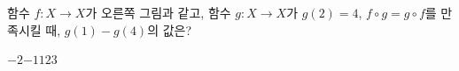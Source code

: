 \noindent\begin{minipage}[t]{0.58\linewidth}\vspace{0pt}\raggedright 함수 $f:X\longrightarrow X$가 오른쪽 그림과 같고, 함수 $g:X\longrightarrow X$가 $g(2)=4$, $f\circ g=g\circ f$를 만족시킬 때, $g(1)-g(4)$의 값은?\end{minipage}\hfill\begin{minipage}[t]{0.4\linewidth}\vspace{0pt}\centering \resizebox{\ifdim\width>\linewidth\linewidth\else\width\fi}{!}{}\end{minipage}\par
\begin{choicesii}{$-2$}{$-1$}{$1$}{$2$}{$3$}\end{choicesii}
